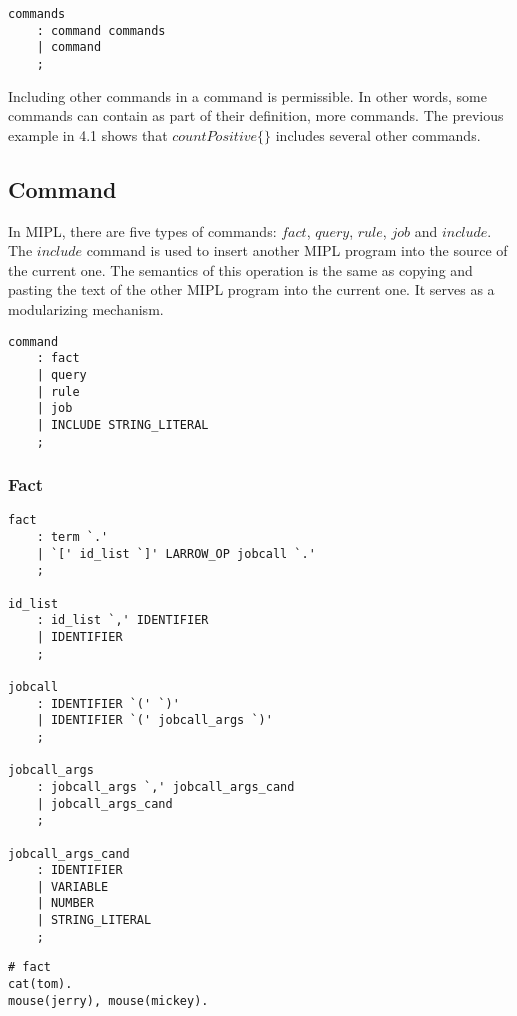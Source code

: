 \documentclass[prodmode,acmtecs]{acmsmall}
\begin{document}
\begin{lstlisting}
commands
	: command commands
	| command
	;
\end{lstlisting}

Including other commands in a command is permissible. In other words, some commands
can contain as part of their definition, more commands. The previous example in 4.1
shows that $countPositive\{\}$ includes several other commands. 
\medskip

\subsection{Command}

In MIPL, there are five types of commands: $fact$, $query$, $rule$, $job$ and $include$.
The $include$ command is used to insert another MIPL program into the source of the 
current one. The semantics of this operation is the same as copying and pasting the
text of the other MIPL program into the current one. It serves as a modularizing mechanism.

\begin{lstlisting}
command
	: fact
	| query
	| rule
	| job
	| INCLUDE STRING_LITERAL
	;
\end{lstlisting}
\medskip


\subsubsection{Fact}
\begin{lstlisting}
fact
	: term `.'			
	| `[' id_list `]' LARROW_OP jobcall `.'
	;

id_list
	: id_list `,' IDENTIFIER
	| IDENTIFIER		
	;

jobcall
	: IDENTIFIER `(' `)'
	| IDENTIFIER `(' jobcall_args `)'
	;

jobcall_args
	: jobcall_args `,' jobcall_args_cand
	| jobcall_args_cand
	;

jobcall_args_cand
	: IDENTIFIER
	| VARIABLE
	| NUMBER
	| STRING_LITERAL
	;
\end{lstlisting}

\begin{lstlisting}
# fact
cat(tom).
mouse(jerry), mouse(mickey).
\end{lstlisting}
\end{document}
